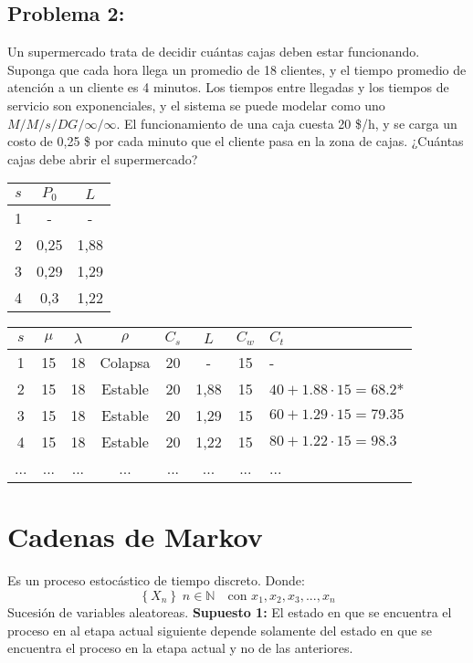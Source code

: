 \documentclass{templateNote}
\begin{document}
\subsection{Problema 2:}
Un supermercado trata de decidir cu\'antas cajas deben estar funcionando. Suponga que cada hora llega un promedio de 18 clientes, y el tiempo promedio de atenci\'on a un cliente es 4 minutos. Los tiempos entre llegadas y los tiempos de servicio son exponenciales, y el sistema se puede modelar como uno $M/M/s/DG/\infty/\infty$. El funcionamiento de una caja cuesta 20 \$/h, y se carga un costo de 0,25 \$ por cada minuto que el cliente pasa en la zona de cajas. ¿Cu\'antas cajas debe abrir el supermercado?
\begin{center}
    \begin{tabular}{|c|c|c|}
        \hline
        $s$ & $P_0$ & $L$ \\ \hline
        1 & - & - \\
        2 & 0,25 & 1,88 \\
        3 & 0,29 & 1,29 \\
        4 & 0,3 & 1,22 \\ \hline
    \end{tabular}
\end{center}
\begin{center}
    \begin{tabular}{ccccccc|l}
        $s$ & $\mu$ & $\lambda$ & $\rho$ & $C_s$ & $L$ & $C_w$ & $C_t$\\ \hline
        1 & 15 & 18 & Colapsa & 20 & - & 15 & - \\
        2 & 15 & 18 & Estable & 20 & 1,88 & 15 & $40 + 1.88 \cdot 15 = 68.2$* \\
        3 & 15 & 18 & Estable & 20 & 1,29 & 15 & $60 + 1.29 \cdot 15 = 79.35$ \\
        4 & 15 & 18 & Estable & 20 & 1,22 & 15 & $80 + 1.22 \cdot 15 = 98.3$ \\
        ... & ... & ... & ... & ... & ... & ... & ... \\
    \end{tabular}
\end{center}

\newpage
\section{Cadenas de Markov}
Es un proceso estoc\'astico de tiempo discreto. Donde:
\begin{equation*}
    \left\{X_n\right\} \; n \in \mathbb{N} \quad \text{con } x_1, x_2, x_3, ..., x_n
\end{equation*}
Sucesi\'on de variables aleatoreas. \newline
\textbf{Supuesto 1:}
El estado en que se encuentra el proceso en al etapa actual siguiente depende solamente del estado en que se encuentra el proceso en la etapa actual y no de las anteriores.
\end{document}
